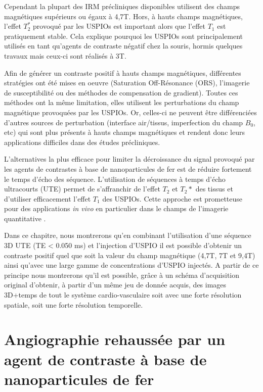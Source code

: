 Cependant la plupart des IRM précliniques disponibles utilisent des champs magnétiques supérieurs ou égaux à 4,7T. Hors, à hauts champs magnétiques, l'effet $T_2^*$ provoqué par les USPIOs est important alors que l'effet $T_1$ est pratiquement stable. Cela explique pourquoi les USPIOs sont principalement utilisés en tant qu'agents de contraste négatif chez la souris, hormis quelques travaux \cite{Jung:2014aa,Girard:2011ec,Loubeyre:1997aa} mais ceux-ci sont réalisés à 3T.

Afin de générer un contraste positif à hauts champs magnétiques, différentes stratégies ont été mises en oeuvre (Saturation Off-Résonance (ORS), l'imagerie de susceptibilité ou des méthodes de compensation de gradient). Toutes ces méthodes ont la même limitation, elles utilisent les perturbations du champ magnétique provoquées par les USPIOs. Or, celles-ci ne peuvent être différenciées d'autres sources de perturbation (interface air/tissus, imperfection du champ $B_0$, etc) qui sont plus présents à hauts champs magnétiques et rendent donc leurs applications difficiles dans des études précliniques.

L'alternatives la plus efficace pour limiter la décroissance du signal provoqué par les agents de contrastes à base de nanoparticules de fer est de réduire fortement le temps d'écho des séquence. L'utilisation de séquences à temps d'écho ultracourts (UTE) permet de s'affranchir de l'effet $T_2$ et $T_2*$ des tissus \cite{Tyler2007Magnetic-resona} et d'utiliser efficacement l'effet $T_1$ des USPIOs. Cette approche est prometteuse pour des applications \textit{in vivo} en particulier dans le champs de l'imagerie quantitative \cite{Girard:2011ec,Gharagouzloo2015Quantitative-co}.


Dans ce chapitre, nous montrerons qu'en combinant l'utilisation d'une séquence 3D UTE (TE < 0.050 ms) et l'injection d'USPIO il est possible d'obtenir un contraste positif quel que soit la valeur du champ  magnétique (4,7T, 7T et 9,4T) ainsi qu'avec une large gamme de concentrations d'USPIO injectés. A partir de ce principe nous montrerons qu’il est possible, grâce à un schéma d’acquisition original d’obtenir, à partir d’un même jeu de donnée acquis, des images 3D+temps de tout le système cardio-vasculaire soit avec une forte résolution spatiale, soit une forte résolution temporelle.


\section{Angiographie rehaussée par un agent de contraste à base de nanoparticules de fer}

